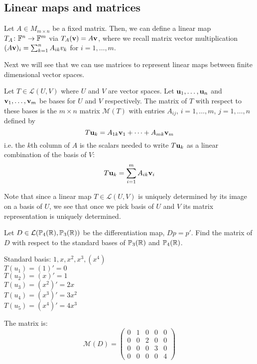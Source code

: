 \documentclass{article}
\begin{document}
\subsection{Linear maps and matrices}
\begin{example}
Let $A\in M_{m\times n}$ be a fixed matrix. Then, we can define a linear map $T_A \colon {\mathbb{F}}^n \to {\mathbb{F}}^m$ via $T_A({\mathbf{v}}) = A {\mathbf{v}}$, where we recall matrix vector multiplication $(A{\mathbf{v}})_i = \sum_{k=1}^n A_{ik}v_k$ for $i=1, \ldots, m$.
\end{example}

Next we will see that we can use matrices to represent linear maps between finite dimensional vector spaces. 

\begin{definition}\label{def:matrix_rep}
Let $T \in \mathcal{L}(U,V)$ where $U$ and $V$ are vector spaces. Let ${\mathbf{u}}_1, \ldots, {\mathbf{u}}_n$ and ${\mathbf{v}}_1, \ldots, {\mathbf{v}}_m$ be bases for $U$ and $V$ respectively. The matrix of $T$ with respect to these bases is the $m \times n$ matrix $\mathcal{M}(T)$ with entries $A_{ij}$, $i = 1, \ldots, m$, $j = 1, \ldots, n$ defined by
\begin{equation*}
    T{\mathbf{u}}_k = A_{1k} {\mathbf{v}}_1 + \cdots + A_{mk} {\mathbf{v}}_m
\end{equation*}
i.e. the $k$th column of $A$ is the scalars needed to write $T {\mathbf{u}}_k$ as a linear combination of the basis of $V$:
\begin{equation*}
    T {\mathbf{u}}_k = \sum_{i=1}^m A_{ik} {\mathbf{v}}_i 
\end{equation*}
\end{definition}

Note that since a linear map $T\in \mathcal{L}(U,V)$ is uniquely determined by its image on a basis of $U$, we see that once we pick basis of $U$ and $V$ its matrix representation is uniquely determined. 

\begin{example}
Let $D \in \mathcal{L}(\mathbb{P}_4({\mathbb{R}}),\mathbb{P}_3({\mathbb{R}}))$ be the differentiation map, $Dp = p'$. Find the matrix of $D$ with respect to the standard bases of $\mathbb{P}_3({\mathbb{R}})$ and $\mathbb{P}_4({\mathbb{R}})$.

Standard basis: $1, x, x^2, x^3, (x^4)$ \\
$T(u_1) = (1)' = 0$ \\
$T(u_2) = (x)' = 1$ \\ 
$T(u_3) = (x^2)' = 2 x$ \\ 
$T(u_4) = (x^3)' = 3 x^2$ \\
$T(u_5) = (x^4)' = 4 x^3$

The matrix is:
\begin{equation*}
    \mathcal{M}(D) = \begin{pmatrix}
    0 & 1 & 0 & 0 & 0 \\
    0 & 0 & 2 & 0 & 0 \\
    0 & 0 & 0 & 3 & 0 \\
    0 & 0 & 0 & 0 & 4
     \end{pmatrix}
\end{equation*}
\end{example}
\end{document}
